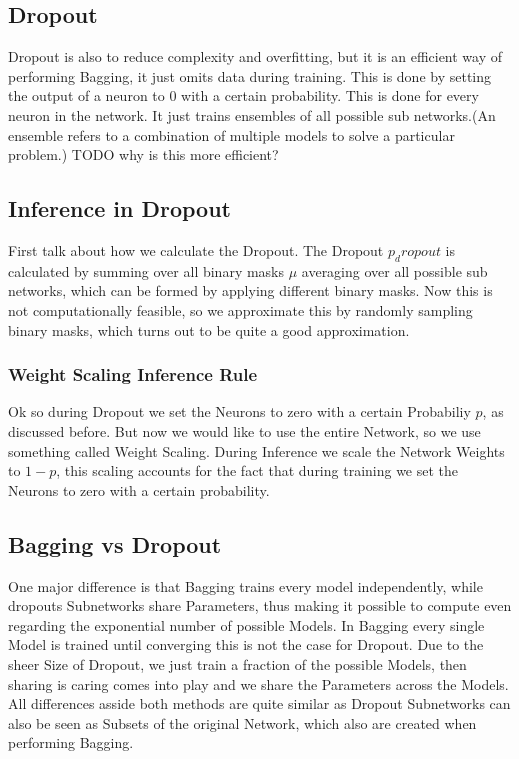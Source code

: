 \documentclass[a4paper]{article}
\begin{document}
\subsection{Dropout}
Dropout is also to reduce complexity and overfitting, but it is an efficient way of performing Bagging, it just omits data during training. This is done by setting the output of a neuron to 0 with a certain probability. This is done for every neuron in the network. It just trains ensembles of all possible sub networks.(An ensemble refers to a combination of multiple models to solve a particular problem.) TODO why is this more efficient?

\subsection{Inference in Dropout}
First talk about how we calculate the Dropout. The Dropout $p_dropout$ is calculated by summing over all binary masks $\mu$ averaging over all possible sub networks, which can be formed by applying different binary masks. Now this is not computationally feasible, so we approximate this by randomly sampling binary masks, which turns out to be quite a good approximation. 
\subsubsection{Weight Scaling Inference Rule}
Ok so during Dropout we set the Neurons to zero with a certain Probabiliy $p$, as discussed before. But now we would like to use the entire Network, so we use something called Weight Scaling. During Inference we scale the Network Weights to $1-p$, this scaling accounts for the fact that during training we set the Neurons to zero with a certain probability.

\subsection{Bagging vs Dropout}
One major difference is that Bagging trains every model independently, while dropouts Subnetworks share Parameters, thus making it possible to compute even regarding the exponential number of possible Models. In Bagging every single Model is trained until converging this is not the case for Dropout. Due to the sheer Size of Dropout, we just train a fraction of the 
possible Models, then sharing is caring comes into play and we share the Parameters across the Models. All differences asside both methods are quite similar as Dropout Subnetworks can also be seen as Subsets of the original Network, which also are created when performing Bagging.
\end{document}
